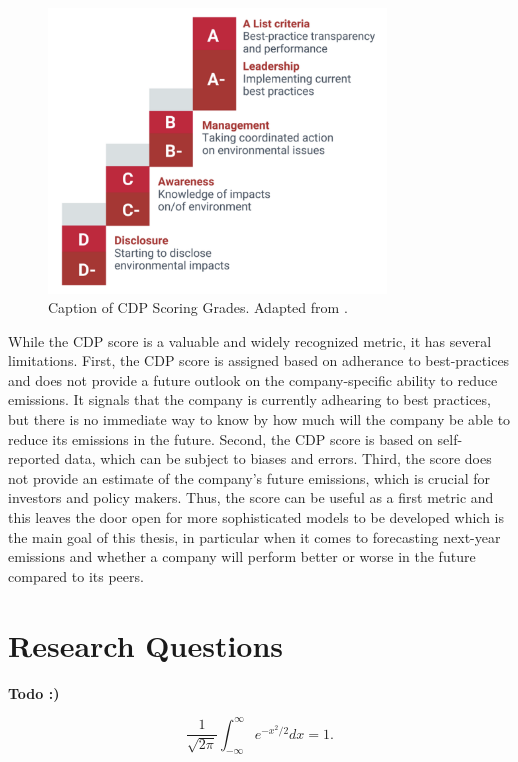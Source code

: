 \begin{figure}[h]
    \centering
    \includegraphics[width=0.8\textwidth]{figures/cdp_scoring.png}
    \caption{Caption of CDP Scoring Grades. Adapted from \cite{CDP2022ScoringPDF}.}
    \label{fig:my_label}
\end{figure}


\noindent While the CDP score is a valuable and widely recognized metric, it has several limitations. First, the CDP score is assigned based on adherance to best-practices and does not provide a future outlook on the company-specific ability to reduce emissions. It signals that the company is currently adhearing to best practices, but there is no immediate way to know by how much will the company be able to reduce its emissions in the future. Second, the CDP score is based on self-reported data, which can be subject to biases and errors. Third, the score does not provide an estimate of the company's future emissions, which is crucial for investors and policy makers. Thus, the score can be useful as a first metric and this leaves the door open for more sophisticated models to be developed which is the main goal of this thesis, in particular when it comes to forecasting next-year emissions and whether a company will perform better or worse in the future compared to its peers.

\section{Research Questions}
\textbf{Todo :)}


$$\frac{1}{\sqrt{2\pi}} \int_{-\infty}^\infty e^{-x^2/2}dx = 1.$$

